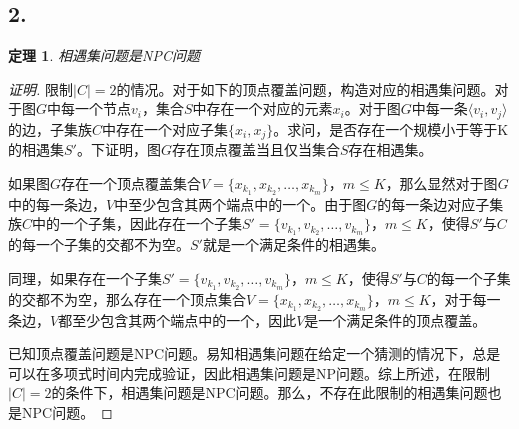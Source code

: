 \documentclass[a4paper]{article}
\newtheorem{theorem}{定理}
\begin{document}
\subsection*{2.}
\begin{theorem}
  相遇集问题是NPC问题
\end{theorem}
\begin{proof}[证明]
  限制$\left\lvert C\right\rvert=2$的情况。对于如下的顶点覆盖问题，构造对应的相遇集问题。对于图$G$中每一个节点$v_i$，集合$S$中存在一个对应的元素$x_i$。对于图$G$中每一条$\langle v_i, v_j \rangle$的边，子集族$C$中存在一个对应子集$\{x_i, x_j\}$。求问，是否存在一个规模小于等于K的相遇集$S'$。下证明，图$G$存在顶点覆盖当且仅当集合$S$存在相遇集。

  如果图$G$存在一个顶点覆盖集合$V=\{x_{k_1}, x_{k_2}, \dots, x_{k_m}\}$，$m\leq K$，那么显然对于图$G$中的每一条边，$V$中至少包含其两个端点中的一个。由于图$G$的每一条边对应子集族$C$中的一个子集，因此存在一个子集$S'=\{v_{k_1}, v_{k_2}, \dots, v_{k_m}\}$，$m\leq K$，使得$S'$与$C$的每一个子集的交都不为空。$S'$就是一个满足条件的相遇集。

  同理，如果存在一个子集$S'=\{v_{k_1}, v_{k_2}, \dots, v_{k_m}\}$，$m\leq K$，使得$S'$与$C$的每一个子集的交都不为空，那么存在一个顶点集合$V=\{x_{k_1}, x_{k_2}, \dots, x_{k_m}\}$，$m\leq K$，对于每一条边，$V$都至少包含其两个端点中的一个，因此$V$是一个满足条件的顶点覆盖。

  已知顶点覆盖问题是NPC问题。易知相遇集问题在给定一个猜测的情况下，总是可以在多项式时间内完成验证，因此相遇集问题是NP问题。综上所述，在限制$\left\lvert C\right\rvert=2$的条件下，相遇集问题是NPC问题。那么，不存在此限制的相遇集问题也是NPC问题。
\end{proof}
\end{document}
